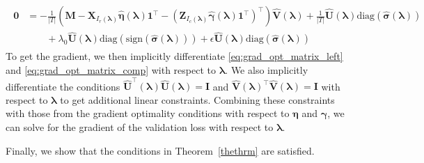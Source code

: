 \documentclass[12pt,letterpaper]{article}
\begin{document}
\begin{align}
\begin{split}
\boldsymbol{0} & = - \frac{1}{|T|} 
\left (
\boldsymbol{M} 
- \boldsymbol{X}_{I_r(\boldsymbol{\lambda})} \hat{\boldsymbol{\eta}}(\boldsymbol{\lambda}) \boldsymbol{1}^\top 
- (\boldsymbol{Z}_{I_c(\boldsymbol{\lambda})} \hat{\boldsymbol{\gamma}}(\boldsymbol{\lambda})  \boldsymbol{1}^\top )^\top
\right )
\hat{\boldsymbol{V}}(\boldsymbol{\lambda})
+ \frac{1}{|T|} 
\hat{\boldsymbol{U}}(\boldsymbol{\lambda})
\text{diag}(\hat{\boldsymbol{\sigma}}(\boldsymbol{\lambda})) 
\\
& \qquad + \lambda_0 \hat{\boldsymbol{U}}(\boldsymbol{\lambda}) \text{diag}(\text{sign}(\hat{\boldsymbol{\sigma}}(\boldsymbol{\lambda})))
+ \epsilon \hat{\boldsymbol{U}}(\boldsymbol{\lambda}) \text{diag}(\hat{\boldsymbol{\sigma}}(\boldsymbol{\lambda}))
\end{split}
\label{eq:grad_opt_matrix_comp}
\end{align}
To get the gradient, we then implicitly differentiate \eqref{eq:grad_opt_matrix_left} and \eqref{eq:grad_opt_matrix_comp} with respect to $\boldsymbol{\lambda}$.
We also implicitly differentiate the conditions $\boldsymbol{\hat U}^\top(\boldsymbol{\lambda}) \boldsymbol{\hat{U}}(\boldsymbol{\lambda}) = \boldsymbol{I}$ and $\boldsymbol{\hat{V}}(\boldsymbol{\lambda})^\top \boldsymbol{\hat{V}}(\boldsymbol{\lambda}) = \boldsymbol{I}$ with respect to $\boldsymbol{\lambda}$ to get additional linear constraints. Combining these constraints with those from the gradient optimality conditions with respect to $\boldsymbol{\eta}$ and $\boldsymbol{\gamma}$, we can solve for the gradient of the validation loss with respect to $\boldsymbol{\lambda}$.

Finally, we show that the conditions in Theorem~\ref{thethrm} are satisfied.
\end{document}
